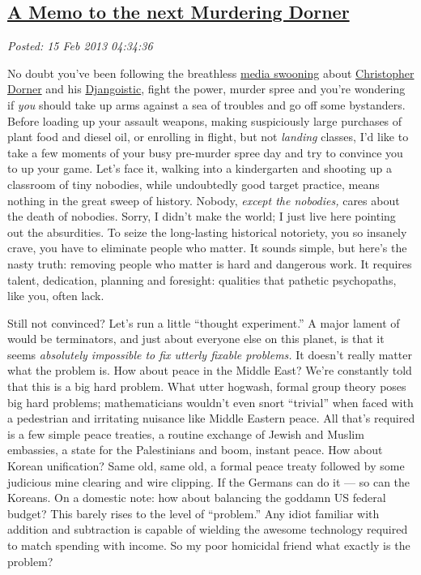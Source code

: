 %

\subsection*{\href{http://bakerjd99.wordpress.com/2013/02/14/a-memo-to-the-next-murdering-dorner/}{A Memo to the next Murdering Dorner}}


\noindent\emph{Posted: 15 Feb 2013 04:34:36}
\vspace{6pt}

No doubt you've been following the breathless
\href{http://patdollard.com/2013/02/chris-matthews-heaps-praise-on-chris-dorner-returning-favor/}{media
swooning} about
\href{http://www.thedailybeast.com/articles/2013/02/14/how-christopher-dorner-went-down.html}{Christopher
Dorner} and his
\href{http://www.mediaite.com/tv/cnn-panelists-dorners-exciting-rampage-like-watching-django-exact-revenge-for-police-brutality/}{Djangoistic},
fight the power, murder spree and you're wondering if \emph{you} 
should take up arms against a sea of troubles and go off some
bystanders. Before loading up your assault weapons, making suspiciously
large purchases of plant food and diesel oil, or enrolling in flight,
but not \emph{landing} classes, I'd like to take a few moments of your
busy pre-murder spree day and try to convince you to up your game. Let's
face it, walking into a kindergarten and shooting up a classroom of tiny
nobodies, while undoubtedly good target practice, means nothing in the
great sweep of history. Nobody, \emph{except the nobodies,} cares about
the death of nobodies. Sorry, I didn't make the world; I just live here
pointing out the absurdities. To seize the long-lasting historical
notoriety, you so insanely crave, you have to eliminate people who
matter. It sounds simple, but here's the nasty truth: removing people
who matter is hard and dangerous work. It requires talent, dedication,
planning and foresight: qualities that pathetic psychopaths, like you,
often lack.

Still not convinced? Let's run a little ``thought experiment.'' A major
lament of would be terminators, and just about everyone else on this
planet, is that it seems \emph{absolutely impossible to fix utterly
fixable problems.} It doesn't really matter what the problem is. How
about peace in the Middle East? We're constantly told that this is a big
hard problem. What utter hogwash, formal group theory poses big hard
problems; mathematicians wouldn't even snort ``trivial'' when faced with
a pedestrian and irritating nuisance like Middle Eastern peace. All
that's required is a few simple peace treaties, a routine exchange of
Jewish and Muslim embassies, a state for the Palestinians and boom,
instant peace. How about Korean unification? Same old, same old, a
formal peace treaty followed by some judicious mine clearing and wire
clipping. If the Germans can do it --- so can the Koreans. On a domestic
note: how about balancing the goddamn US federal budget? This barely
rises to the level of ``problem.'' Any idiot familiar with addition and
subtraction is capable of wielding the awesome technology required to
match spending with income. So my poor homicidal friend what exactly is
the problem?


